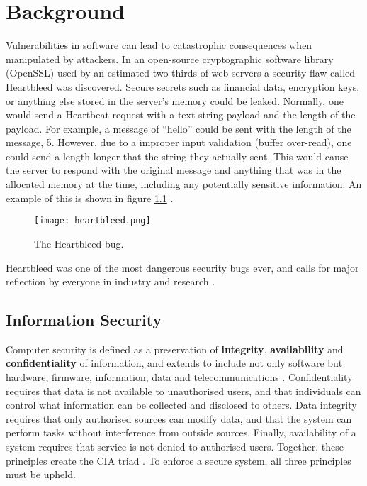 
\chapter{Background}
Vulnerabilities in software can lead to catastrophic consequences when manipulated by attackers. In an open-source cryptographic software library (OpenSSL) used by an estimated two-thirds of web servers \cite{heartbleed} a security flaw called Heartbleed was discovered. Secure secrets such as financial data, encryption keys, or anything else stored in the server's memory could be leaked. Normally, one would send a Heartbeat request with a text string payload and the length of the payload. For example, a message of ``hello'' could be sent with the length of the message, 5. However, due to a improper input validation (buffer over-read), one could send a length longer that the string they actually sent. This would cause the server to respond with the original message and anything that was in the allocated memory at the time, including any potentially sensitive information. An example of this is shown in figure \ref{fig:heartbleed} \cite{heartbleedimg}.

\begin{figure}
    \centering
    \texttt{[image: heartbleed.png]}
    \caption{The Heartbleed bug. \cite{heartbleedimg}}
    \label{fig:heartbleed}
\end{figure}

Heartbleed was one of the most dangerous security bugs ever, and calls for major reflection by everyone in industry and research \cite{balliu2014logics}.

\section{Information Security}

Computer security is defined as a preservation of \textbf{integrity}, \textbf{availability} and \textbf{confidentiality} of information, and extends to include not only software but hardware, firmware, information, data and telecommunications \cite{guttman1995introduction}.
Confidentiality requires that data is not available to unauthorised users, and that individuals can control what information can be collected and disclosed to others. Data integrity requires that only authorised sources can modify data, and that the system can perform tasks without interference from outside sources. Finally, availability of a system requires that service is not denied to authorised users. Together, these principles create the CIA triad \cite{stallings2012computer}. To enforce a secure system, all three principles must be upheld.

